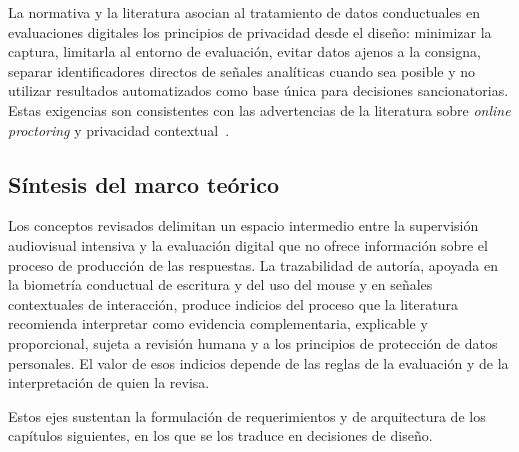 La normativa y la literatura asocian al tratamiento de datos conductuales en evaluaciones digitales los principios de privacidad desde el diseño: minimizar la captura, limitarla al entorno de evaluación, evitar datos ajenos a la consigna, separar identificadores directos de señales analíticas cuando sea posible y no utilizar resultados automatizados como base única para decisiones sancionatorias. Estas exigencias son consistentes con las advertencias de la literatura sobre \textit{online proctoring} y privacidad contextual~\parencite{Mutimukwe2023}.

\subsection{Síntesis del marco teórico}
\label{sec:sintesis_marco_teorico}

Los conceptos revisados delimitan un espacio intermedio entre la supervisión audiovisual intensiva y la evaluación digital que no ofrece información sobre el proceso de producción de las respuestas. La trazabilidad de autoría, apoyada en la biometría conductual de escritura y del uso del mouse y en señales contextuales de interacción, produce indicios del proceso que la literatura recomienda interpretar como evidencia complementaria, explicable y proporcional, sujeta a revisión humana y a los principios de protección de datos personales. El valor de esos indicios depende de las reglas de la evaluación y de la interpretación de quien la revisa.

Estos ejes sustentan la formulación de requerimientos y de arquitectura de los capítulos siguientes, en los que se los traduce en decisiones de diseño.
